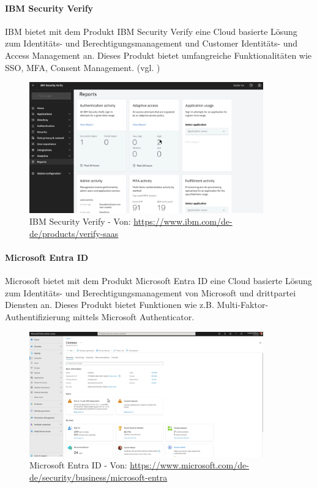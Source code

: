 \documentclass[11pt]{article}
\begin{document}
\paragraph{IBM Security Verify}
IBM bietet mit dem Produkt \glqq{}IBM Security Verify\grqq{} eine Cloud basierte Lösung zum Identitäts- und Berechtigungsmanagement und Customer Identitäts- und Access Management an. Dieses Produkt bietet umfangreiche Funktionalitäten wie SSO, MFA, Consent Management. (vgl. \cite{ibm2024verify})
\begin{figure}[H]
  \centering
  \includegraphics[width=0.9\textwidth]{assets/Verify.png}
  \caption{IBM Security Verify - Von: \url{https://www.ibm.com/de-de/products/verify-saas}}\label{figure:verify}
\end{figure}
\paragraph{Microsoft Entra ID}
Microsoft bietet mit dem Produkt \glqq{}Microsoft Entra ID\grqq{} eine Cloud basierte Lösung zum Identitäts- und Berechtigungsmanagement von Microsoft und drittpartei Diensten an. Dieses Produkt bietet Funktionen wie z.B. Multi-Faktor-Authentifizierung mittels Microsoft Authenticator.
\begin{figure}[H]
  \centering
  \includegraphics[width=0.9\textwidth]{assets/Entra.png}
  \caption{Microsoft Entra ID - Von: \url{https://www.microsoft.com/de-de/security/business/microsoft-entra}}\label{figure:entra}
\end{figure}
\end{document}
